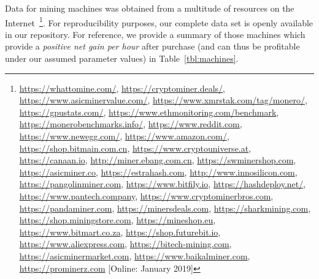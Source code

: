Data for mining machines was obtained from a multitude of resources on the
Internet~\footnote{\url{https://whattomine.com/}, \url{https://cryptominer.deals/}, \url{https://www.asicminervalue.com/}, \url{https://www.xmrstak.com/tag/monero/}, \url{https://gpustats.com/}, \url{https://www.ethmonitoring.com/benchmark}, \url{https://monerobenchmarks.info/}, \url{https://www.reddit.com},
\url{https://www.newegg.com/}, \url{https://www.amazon.com/}, \url{https://shop.bitmain.com.cn}, \url{https://www.cryptouniverse.at}, \url{https://canaan.io}, \url{http://miner.ebang.com.cn}, \url{https://swminershop.com}, \url{https://asicminer.co}, \url{https://estrahash.com}, \url{http://www.innosilicon.com}, \url{https://pangolinminer.com}, \url{https://www.bitfily.io}, \url{https://hashdeploy.net/}, \url{https://www.pantech.company}, \url{https://www.cryptominerbros.com}, \url{https://pandaminer.com}, \url{https://minersdeals.com}, \url{https://sharkmining.com}, \url{https://shop.miningstore.com}, \url{https://mineshop.eu}, \url{https://www.bitmart.co.za}, \url{https://shop.futurebit.io}, \url{https://www.aliexpress.com}, \url{https://bitech-mining.com}, \url{https://asicminermarket.com}, \url{https://www.baikalminer.com}, \url{https://prominerz.com} [Online: January 2019]}. For reproducibility purposes, our complete data set is openly
available in our repository. For reference, we provide a summary of those
machines which provide a \emph{positive net gain per hour} after purchase (and
can thus be profitable under our assumed parameter values) in
Table~\ref{tbl:machines}.

